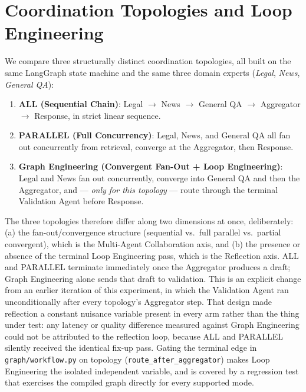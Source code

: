 \documentclass[journal,10pt,compsoc,onecolumn]{IEEEtran}
\begin{document}
\section{Coordination Topologies and Loop Engineering}
\label{sec:validator-gating}
We compare three structurally distinct coordination topologies, all built on the same LangGraph state machine and the same three domain experts (\textit{Legal}, \textit{News}, \textit{General QA}):

\begin{enumerate}
    \item \textbf{ALL (Sequential Chain)}: Legal $\rightarrow$ News $\rightarrow$ General QA $\rightarrow$ Aggregator $\rightarrow$ Response, in strict linear sequence.
    \item \textbf{PARALLEL (Full Concurrency)}: Legal, News, and General QA all fan out concurrently from retrieval, converge at the Aggregator, then Response.
    \item \textbf{Graph Engineering (Convergent Fan-Out + Loop Engineering)}: Legal and News fan out concurrently, converge into General QA and then the Aggregator, and --- \emph{only for this topology} --- route through the terminal Validation Agent before Response.
\end{enumerate}

The three topologies therefore differ along two dimensions at once, deliberately: (a) the fan-out/convergence structure (sequential vs.\ full parallel vs.\ partial convergent), which is the Multi-Agent Collaboration axis, and (b) the presence or absence of the terminal Loop Engineering pass, which is the Reflection axis. ALL and PARALLEL terminate immediately once the Aggregator produces a draft; Graph Engineering alone sends that draft to validation. This is an explicit change from an earlier iteration of this experiment, in which the Validation Agent ran unconditionally after every topology's Aggregator step. That design made reflection a constant nuisance variable present in every arm rather than the thing under test: any latency or quality difference measured against Graph Engineering could not be attributed to the reflection loop, because ALL and PARALLEL silently received the identical fix-up pass. Gating the terminal edge in \texttt{graph/workflow.py} on topology (\texttt{route\_after\_aggregator}) makes Loop Engineering the isolated independent variable, and is covered by a regression test that exercises the compiled graph directly for every supported mode.
\end{document}
